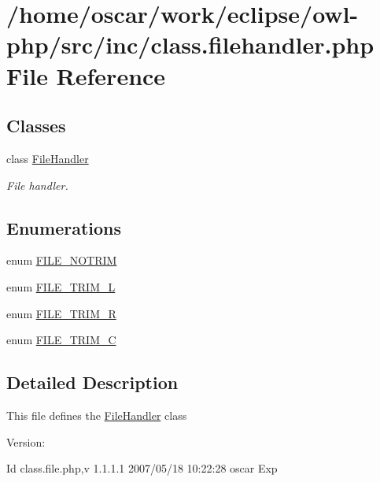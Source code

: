 \hypertarget{class_8filehandler_8php}{
\section{/home/oscar/work/eclipse/owl-php/src/inc/class.filehandler.php File Reference}
\label{class_8filehandler_8php}
}
\subsection*{Classes}
\begin{CompactItemize}
\item 
class \hyperlink{classFileHandler}{FileHandler}
\begin{CompactList}\small\item\em File handler. \item\end{CompactList}\end{CompactItemize}
\subsection*{Enumerations}
\begin{CompactItemize}
\item 
enum \hyperlink{class_8filehandler_8php_3720f2e15eb9e16e29d8ecbb96763662}{FILE\_\-NOTRIM} 
\item 
enum \hyperlink{class_8filehandler_8php_080de95fd7cf2e8d8ac78ac7ad9471ee}{FILE\_\-TRIM\_\-L} 
\item 
enum \hyperlink{class_8filehandler_8php_7ee25ec88036b90f5a0ae8be7bc41769}{FILE\_\-TRIM\_\-R} 
\item 
enum \hyperlink{class_8filehandler_8php_2787c3a1ecef8697c863800d0b2848a4}{FILE\_\-TRIM\_\-C} 
\end{CompactItemize}


\subsection{Detailed Description}
This file defines the \hyperlink{classFileHandler}{FileHandler} class \begin{Desc}
\item[Version:]\end{Desc}
\begin{Desc}
\item[Id]class.file.php,v 1.1.1.1 2007/05/18 10:22:28 oscar Exp \end{Desc}


